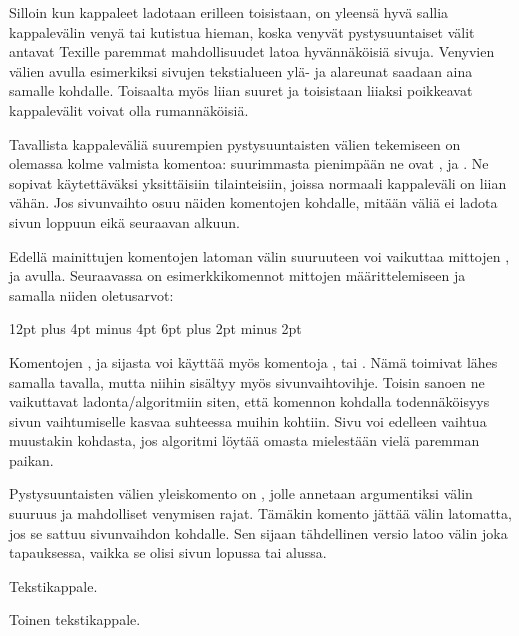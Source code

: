 \noindent
Silloin kun kappaleet ladotaan erilleen toisistaan, on yleensä hyvä
sallia kappalevälin venyä tai kutistua hieman, koska venyvät
pystysuuntaiset välit antavat Texille paremmat mahdollisuudet latoa
hyvännäköisiä sivuja. Venyvien välien avulla esimerkiksi sivujen
tekstialueen ylä- ja alareunat saadaan aina samalle kohdalle. Toisaalta
myös liian suuret ja toisistaan liiaksi poikkeavat kappalevälit voivat
olla rumannäköisiä.

Tavallista kappaleväliä suurempien pystysuuntaisten välien tekemiseen on
olemassa kolme valmista komentoa: suurimmasta pienimpään ne ovat
,  ja . Ne
sopivat käytettäväksi yksittäisiin tilainteisiin, joissa normaali
kappaleväli on liian vähän. Jos sivunvaihto osuu näiden komentojen
kohdalle, mitään väliä ei ladota sivun loppuun eikä seuraavan alkuun.

Edellä mainittujen komentojen latoman välin suuruuteen voi vaikuttaa
mittojen ,  ja
 avulla. Seuraavassa on esimerkkikomennot
mittojen määrittelemiseen ja samalla niiden oletusarvot:

\begin{koodilohkosis}
\setlength{\bigskipamount} {12pt plus 4pt minus 4pt}
\setlength{\medskipamount}  {6pt plus 2pt minus 2pt}
\setlength{\smallskipamount}{3pt plus 1pt minus 1pt}
\end{koodilohkosis}

\noindent
Komentojen ,  ja 
sijasta voi käyttää myös komentoja ,
 tai . Nämä toimivat lähes
samalla tavalla, mutta niihin sisältyy myös sivunvaihtovihje. Toisin
sanoen ne vaikuttavat ladonta\-/algoritmiin siten, että komennon
kohdalla todennäköisyys sivun vaihtumiselle kasvaa suhteessa muihin
kohtiin. Sivu voi edelleen vaihtua muustakin kohdasta, jos algoritmi
löytää omasta mielestään vielä paremman paikan.

Pystysuuntaisten välien yleiskomento on , jolle
annetaan argumentiksi välin suuruus ja mahdolliset venymisen rajat.
Tämäkin komento jättää välin latomatta, jos se sattuu sivunvaihdon
kohdalle. Sen sijaan tähdellinen versio  latoo välin
joka tapauksessa, vaikka se olisi sivun lopussa tai alussa.

\begin{koodilohkosis}
Tekstikappale.
\vspace{5ex plus 1ex minus .5ex}

Toinen tekstikappale.
\end{koodilohkosis}

